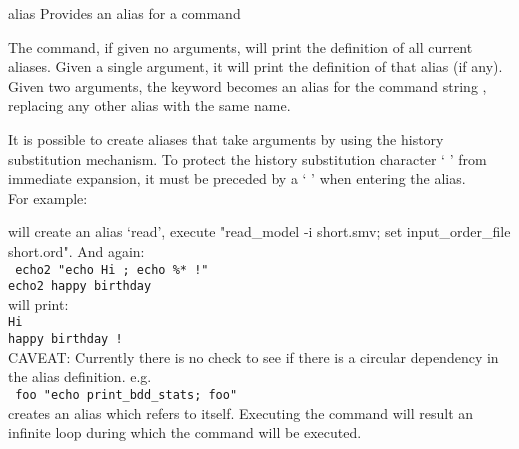 \begin{nusmvCommand} {alias} {Provides an alias for a command}


The  command, if given no arguments, will print the definition
of all current aliases.  Given a single argument, it will print the
definition of that alias (if any).  Given two arguments, the keyword
 becomes an alias for the command string
, replacing any other alias with the same name.\\
\begin{cmdOpt}
\end{cmdOpt}

It is possible to create aliases that take arguments by using the
history substitution mechanism. To protect the history substitution
character ` \code{\%}' from immediate expansion, it must be preceded
by a ` \code{$\backslash$}' when entering the alias. \\

For example:

\noindent
{}
  will create an alias `read', execute "read\_model -i short.smv; 
    set input\_order\_file short.ord".
  And again:\\
   \texttt{\toolprompt {} echo2 "echo Hi ; echo \%* !"\\ 
  \toolprompt echo2 happy birthday\\
  }
  will print:\\
   \texttt{Hi\\
  happy birthday !
  }\\
  CAVEAT: Currently there is no check to see if there is a circular
  dependency in the alias definition. e.g.\\
   \texttt{\toolprompt {} foo "echo print\_bdd\_stats; foo"
  }\\
  creates an alias which refers to itself. Executing the command   
  will result an infinite loop during which the command 
    will be executed.

\end{nusmvCommand}

